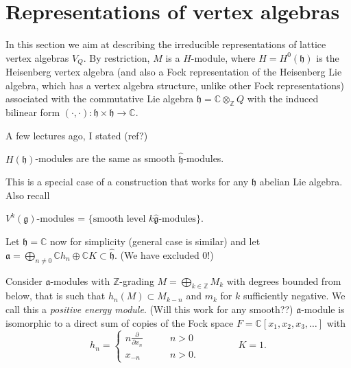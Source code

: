 \section{Representations of vertex algebras}
\label{section-repre-verte-algeb}

\noindent
In this section we aim at describing the
irreducible representations of lattice vertex
algebras $V_Q$.
By restriction, $M$ is a $H$-module,
where $H=H^0(\mathfrak{h})$ is the Heisenberg
vertex algebra
(and also a Fock representation of the
Heisenberg Lie algebra,
which has a vertex algebra
structure, unlike other Fock representations)
associated with the commutative Lie algebra
$\mathfrak{h}=\mathbb{C}\otimes_\mathbb{Z}Q$
with the induced bilinear form
$(\cdot,\cdot):\mathfrak{h}\times\mathfrak{h}
\to\mathbb{C}$.

A few lectures ago, I stated
(ref?)

\begin{proposition}
\label{proposition-past}
$H(\mathfrak{h})$-modules are the same as
smooth $\hat{\mathfrak{h}}$-modules.
\end{proposition}

\noindent
This is a special case of a construction that
works
for any $\mathfrak{h}$ abelian Lie algebra.
Also recall

\begin{proposition}
\label{proposition-past2}
$V^k(\mathfrak{g})$-modules = $\{\text{smooth
level $k$
$\hat{\mathfrak{g}}$-modules}\}$.
\end{proposition}

\noindent
Let $\mathfrak{h}=\mathbb{C}$ now for
simplicity
(general case is similar) and let
$\mathfrak{a}=\bigoplus_{n \neq
0}\mathbb{C}h_n \oplus \mathbb{C} K \subset
\hat{\mathfrak{h}}$. (We have excluded 0!)

\begin{proposition}
\label{proposition-repre-heise}
Consider $\mathfrak{a}$-modules with
$\mathbb{Z}$-grading
$M=\bigoplus_{k \in \mathbb{Z}}M_k$ with
degrees bounded from below,
that is such that $h_n(M) \subset M_{k-n}$
and $m_k$ for $k$ sufficiently negative.
We call this a {\it positive energy module}.
(Will this work for any smooth??)
$\mathfrak{a}$-module is isomorphic to a
direct
sum of copies of the Fock space
$F=\mathbb{C}[x_1,x_2,x_3,\ldots]$
with
$$
h_n=
\begin{cases}
n\frac{\partial }{\partial x_n}\qquad &n>0 \\
x_{-n}\qquad &n>0.
\end{cases}
\qquad \qquad K=1.
$$
\end{proposition}

